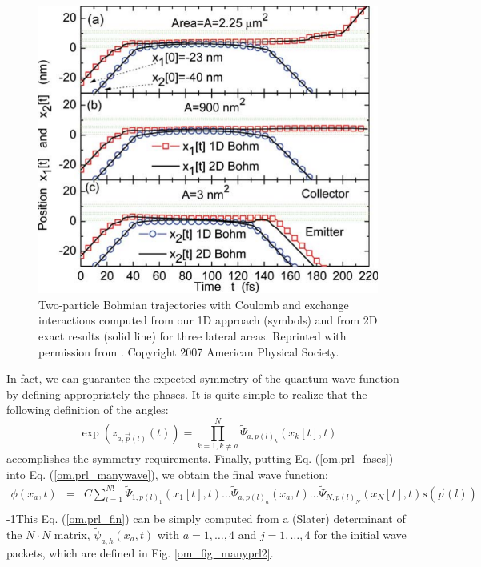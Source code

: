 \documentclass[nofootinbib, secnumarabic, amsmath, nobibnotes,10pt,aps,pra]{revtex4-1}
\newcommand{\fref}[1]{Fig. \ref{#1}}
\newcommand{\eref}[1]{Eq. (\ref{#1})}
\begin{document}
\begin{figure}
\centering
\includegraphics{F1_07.pdf}
\caption{Two-particle Bohmian trajectories with Coulomb and exchange interactions computed from our 1D approach (symbols) and from 2D exact results (solid line) for three lateral areas. Reprinted with permission from \cite{om.oriolsprl}. Copyright 2007 American Physical Society.}
\label{om_fig_prl2}
\end{figure}

In fact, we can guarantee the expected symmetry of the quantum wave
function by defining appropriately the phases. It is quite simple
to realize that the following definition of the angles:
\begin{equation}
\label{om.prl_fases}
 \exp { (z_{a,\vec{p}(l)}(t)) } = \prod^{N}_{k = 1,k\neq a} \tilde \Psi_{a,p(l)_k}(x_k[t],t)
\end{equation}
 accomplishes the symmetry requirements. Finally, putting \eref{om.prl_fases} into \eref{om.prl_manywave}, we obtain the final wave function:
\begin{eqnarray}
\phi(x_a,t) &=& C \sum\limits_{l = 1}^{N!}{{{\tilde{\Psi }}}_{1,
p{{(l)}}_1}}({{x}_{1}}[t],t)\ldots {{{\tilde{\Psi }}}_{a, p{{(l)}}_a}}({{x}_{a}},t)\ldots{{{\tilde{\Psi }}}_{N, p{{(l)}}_N}}{({{x}_{N}}[t],t) s(\vec{p}(l))}\nonumber\\
 \label{om.prl_fin}
 \end{eqnarray}
\looseness-1This Eq. (\ref{om.prl_fin}) can be simply computed from a (Slater) determinant of the $N \cdot N$ matrix, $\tilde{\psi}_{a,h}(x_a,t)$ with $a = 1, \ldots , 4$ and $j = 1, \ldots , 4$ for the initial wave packets, which are defined in \fref{om_fig_manyprl2}.
\end{document}
